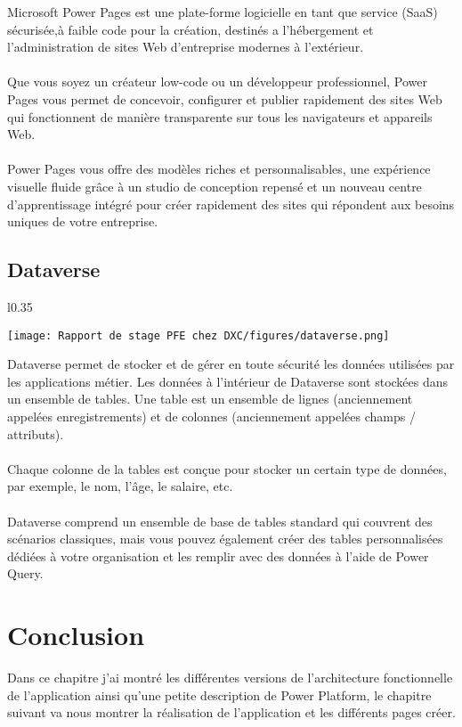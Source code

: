 Microsoft Power Pages est une plate-forme logicielle en tant que service (SaaS) sécurisée,à faible code pour la création, destinés a l'hébergement et l'administration de sites Web d'entreprise modernes à l'extérieur. 
\\\\
Que vous soyez un créateur low-code ou un développeur professionnel, Power Pages vous permet de concevoir, configurer et publier rapidement des sites Web qui fonctionnent de manière transparente sur tous les navigateurs et appareils Web.
\\\\
Power Pages vous offre des modèles riches et personnalisables, une expérience visuelle fluide grâce à un studio de conception repensé et un nouveau centre d'apprentissage intégré pour créer rapidement des sites qui répondent aux besoins uniques de votre entreprise.

\subsection{Dataverse }

\begin{wrapfigure}{l}{0.35\textwidth}
  \begin{center}
    \texttt{[image: Rapport de stage PFE chez DXC/figures/dataverse.png]}
  \end{center}
\end{wrapfigure}

Dataverse permet de stocker et de gérer en toute sécurité les données utilisées par les applications métier. Les données à l’intérieur de Dataverse sont stockées dans un ensemble de tables. Une table est un ensemble de lignes (anciennement appelées enregistrements) et de colonnes (anciennement appelées champs / attributs). 
\\\\
Chaque colonne de la tables est conçue pour stocker un certain type de données, par exemple, le nom, l’âge, le salaire, etc. 
\\\\
Dataverse comprend un ensemble de base de tables standard qui couvrent des scénarios classiques, mais vous pouvez également créer des tables personnalisées dédiées à votre organisation et les remplir avec des données à l’aide de Power Query. 

\section{Conclusion}
Dans ce chapitre j'ai montré les différentes versions de l'architecture fonctionnelle de l'application ainsi qu'une petite description de Power Platform, le chapitre suivant va nous montrer la réalisation de l'application et les différents pages créer.




